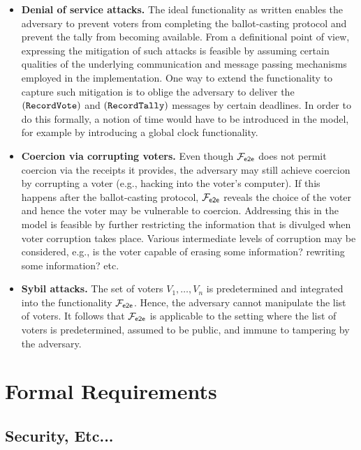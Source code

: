 \begin{itemize}
\item \textbf{Denial of service attacks.} The ideal functionality as
  written enables the adversary to prevent voters from completing the
  ballot-casting protocol and prevent the tally from becoming
  available. From a definitional point of view, expressing the
  mitigation of such attacks is feasible by assuming certain qualities
  of the underlying communication and message passing mechanisms
  employed in the implementation. One way to extend the functionality
  to capture such mitigation is to oblige the adversary to deliver the
  $(\mathtt{RecordVote})$ and $(\mathtt{RecordTally})$ messages by certain
  deadlines. In order to do this formally, a notion of time would have
  to be introduced in the model, for example by introducing a global
  clock functionality.

\item \textbf{Coercion via corrupting voters.} Even though $\mathcal{F}_{\mathsf{e2e}}$
  does not permit coercion via the receipts it provides, the adversary
  may still achieve coercion by corrupting a voter (e.g., hacking into
  the voter's computer). If this happens after the ballot-casting
  protocol, $\mathcal{F}_{\mathsf{e2e}}$ reveals the choice of the voter and hence the
  voter may be vulnerable to coercion.  Addressing this in the model
  is feasible by further restricting the information that is divulged
  when voter corruption takes place. Various intermediate levels of
  corruption may be considered, e.g., is the voter capable of erasing
  some information? rewriting some information? etc.

\item \textbf{Sybil attacks.} The set of voters $V_1,\ldots,V_n$ is
  predetermined and integrated into the functionality $\mathcal{F}_{\mathsf{e2e}}$. Hence,
  the adversary cannot manipulate the list of voters.  It follows that
  $\mathcal{F}_{\mathsf{e2e}}$ is applicable to the setting where the list of voters is
  predetermined, assumed to be public, and immune to tampering by the
  adversary. 
\end{itemize}

\section{Formal Requirements}
\subsection{Security, Etc...}

